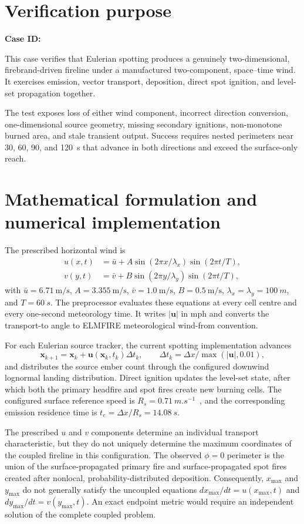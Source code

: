 \section{Verification purpose}

\textbf{Case ID:} \CaseID

This case verifies that Eulerian spotting produces a genuinely two-dimensional, firebrand-driven fireline under a manufactured two-component, space--time wind. It exercises emission, vector transport, deposition, direct spot ignition, and level-set propagation together.

The test exposes loss of either wind component, incorrect direction conversion, one-dimensional source geometry, missing secondary ignitions, non-monotone burned area, and stale transient output. Success requires nested perimeters near 30, 60, 90, and 120~s that advance in both directions and exceed the surface-only reach.

\section{Mathematical formulation and numerical implementation}
The prescribed horizontal wind is
\begin{align}
u(x,t)&=\bar u+A\sin(2\pi x/\lambda_x)\sin(2\pi t/T),\\
v(y,t)&=\bar v+B\sin(2\pi y/\lambda_y)\sin(2\pi t/T),
\end{align}
with $\bar u=\SI{6.71}{\metre\per\second}$, $A=\SI{3.355}{\metre\per\second}$, $\bar v=\SI{1.0}{\metre\per\second}$, $B=\SI{0.5}{\metre\per\second}$, $\lambda_x=\lambda_y=\SI{100}{m}$, and $T=\SI{60}{s}$. The preprocessor evaluates these equations at every cell centre and every one-second meteorology time. It writes $|\mathbf u|$ in mph and converts the transport-to angle to ELMFIRE meteorological wind-from convention.

For each Eulerian source tracker, the current spotting implementation advances
\[
\mathbf x_{k+1}=\mathbf x_k+\mathbf u(\mathbf x_k,t_k)\Delta t_k,
\qquad \Delta t_k=\Delta x/\max(|\mathbf u|,0.01),
\]
and distributes the source ember count through the configured downwind lognormal landing distribution. Direct ignition updates the level-set state, after which both the primary headfire and spot fires create new burning cells. The configured surface reference speed is $R_s=\SI{0.71}{m.s^{-1}}$~\cite{Qin2025}, and the corresponding emission residence time is $t_e=\Delta x/R_s=\SI{14.08}{s}$.

The prescribed $u$ and $v$ components determine an individual transport
characteristic, but they do not uniquely determine the maximum coordinates of
the coupled fireline in this configuration. The observed $\phi=0$ perimeter is
the union of the surface-propagated primary fire and surface-propagated spot
fires created after nonlocal, probability-distributed deposition. Consequently,
$x_{\max}$ and $y_{\max}$ do not generally satisfy the uncoupled equations
$dx_{\max}/dt=u(x_{\max},t)$ and $dy_{\max}/dt=v(y_{\max},t)$. An exact endpoint
metric would require an independent solution of the complete coupled problem.


